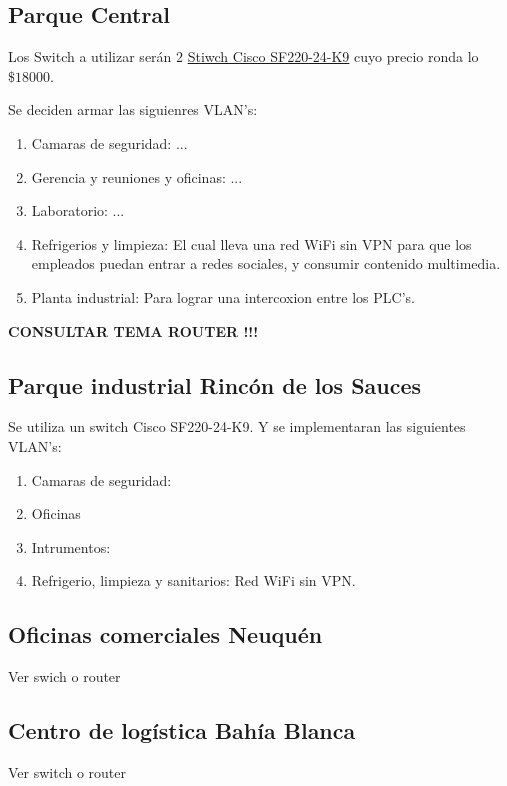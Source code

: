 \documentclass[11pt]{article}
\begin{document}
    \subsection*{Parque Central}

        Los Switch a utilizar serán $2$ \href{https://articulo.mercadolibre.com.ar/MLA-714545399-switch-cisco-semi-admin-24-puertos-10100-2-giga-sf220-24-k9-_JM#position=34&type=item&tracking_id=4df4b6b4-1084-45cf-bab2-a07d312cf877}{Stiwch Cisco SF220-24-K9}
        cuyo precio ronda lo $\$18000$.


        Se deciden armar las siguienres VLAN's: 

        \begin{enumerate}
            \item Camaras de seguridad: ... 
            \item Gerencia y reuniones y oficinas: ...  
            \item Laboratorio: ...
            \item Refrigerios y limpieza: El cual lleva una red WiFi sin VPN para que los empleados puedan entrar a redes sociales, y 
                consumir contenido multimedia.
            \item Planta industrial: Para lograr una intercoxion entre los PLC's.
        \end{enumerate}

        \textbf{CONSULTAR TEMA ROUTER !!!}
        

    \subsection*{Parque industrial Rincón de los Sauces}

    Se utiliza un switch Cisco SF220-24-K9. Y se implementaran las siguientes VLAN's: 

    \begin{enumerate}
        \item Camaras de seguridad: 
        \item Oficinas 
        \item Intrumentos: 
        \item Refrigerio, limpieza y sanitarios: Red WiFi sin VPN. 
    \end{enumerate}

    \subsection*{Oficinas comerciales Neuquén}

    Ver swich o router

    \subsection*{Centro de logística Bahía Blanca}

    Ver switch o router

    
\end{document}
